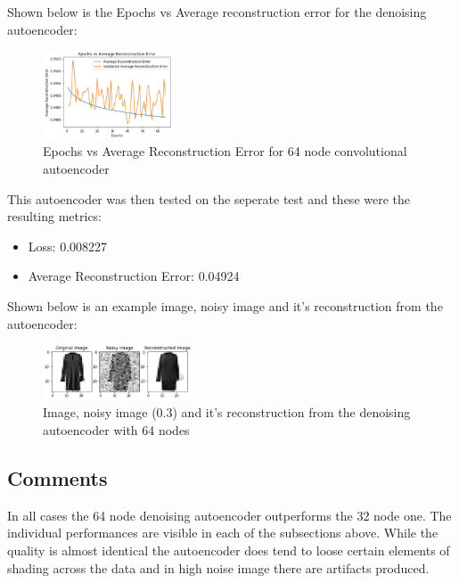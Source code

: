 \documentclass[conference]{IEEEtran}
\begin{document}
    Shown below is the Epochs vs Average reconstruction error for the denoising autoencoder:

    \begin{figure}[H]
        \centering
        \captionsetup{justification=centering}
        \centering
            \includegraphics[width=0.35\textwidth]{41.png}
            \caption{Epochs vs Average Reconstruction Error for 64 node convolutional autoencoder}
    \end{figure}

    This autoencoder was then tested on the seperate test and these were the resulting metrics:

    \begin{itemize}
        \item Loss: 0.008227
        \item Average Reconstruction Error: 0.04924\\
    \end{itemize}

    Shown below is an example image, noisy image and it's reconstruction from the autoencoder:

    \begin{figure}[H]
        \centering
        \captionsetup{justification=centering}
        \centering
            \includegraphics[width=0.4\textwidth]{42.png}
            \caption{Image, noisy image (0.3) and it's reconstruction from the denoising autoencoder with 64 nodes}
    \end{figure}

    \subsection{Comments}

    In all cases the 64 node denoising autoencoder outperforms the 32 node one. The individual performances are visible in
    each of the subsections above. While the quality is almost identical the autoencoder does tend to loose certain elements
    of shading across the data and in high noise image there are artifacts produced.
\end{document}
